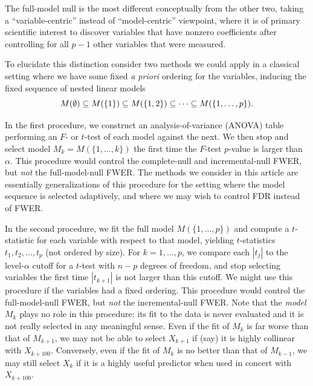 \documentclass{article}
\begin{document}
The full-model null is the most different conceptually from the other two, taking a ``variable-centric'' instead of ``model-centric'' viewpoint, where it is of primary scientific interest to discover variables that have nonzero coefficients after controlling for all $p-1$ other variables that were measured.

To elucidate this distinction consider two methods we could apply in a classical setting where we have some fixed {\em a priori} ordering for the variables, inducing the fixed sequence of nested linear models
\[
M(\emptyset) \subseteq M(\{1\}) \subseteq M(\{1,2\}) \subseteq \cdots \subseteq M(\{1,\ldots, p\}).
\]

In the first procedure, we construct an analysis-of-variance (ANOVA) table performing an $F$- or $t$-test of each model against the next. We then stop and select model $M_k=M(\{1,\ldots,k\})$ the first time the $F$-test $p$-value is larger than $\alpha$. This procedure would control the complete-null and incremental-null FWER, but {\em not} the full-model-null FWER. The methods we consider in this article are essentially generalizations of this procedure for the setting where the model sequence is selected adaptively, and where we may wish to control FDR instead of FWER.

In the second procedure, we fit the full model $M(\{1,\ldots,p\})$ and compute a $t$-statistic for each variable with respect to that model, yielding $t$-statistics $t_1, t_2, \ldots, t_p$ (not ordered by size). For $k=1,\ldots,p$, we compare each $|t_j|$ to the level-$\alpha$ cutoff for a $t$-test with $n-p$ degrees of freedom, and stop selecting variables the first time $|t_{k+1}|$ is not larger than this cutoff. We might use this procedure if the variables had a  fixed ordering.
This procedure would control the full-model-null FWER, but {\em not} the incremental-null FWER. Note that the {\em model} $M_k$ plays no role in this procedure: its fit to the data is never evaluated and it is not really selected in any meaningful sense. Even if the fit of $M_k$ is far worse than that of $M_{k+1}$, we may not be able to select $X_{k+1}$ if (say) it is highly collinear with $X_{k+100}$. Conversely, even if the fit of $M_k$ is no better than that of $M_{k-1}$, we may still select $X_k$ if it is a highly useful predictor when used in concert with $X_{k+100}$.
\end{document}
